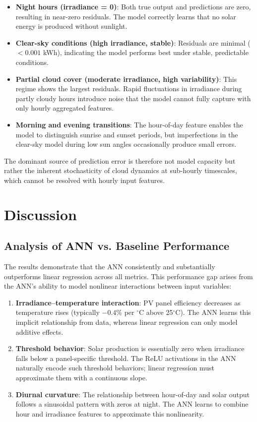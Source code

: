 \documentclass[11pt, a4paper]{article}
\begin{document}
\begin{itemize}
    \item \textbf{Night hours (irradiance = 0)}: Both true output and predictions
    are zero, resulting in near-zero residuals. The model correctly learns that
    no solar energy is produced without sunlight.
    \item \textbf{Clear-sky conditions (high irradiance, stable)}: Residuals are
    minimal ($< 0.001$ kWh), indicating the model performs best under stable,
predictable conditions.
    \item \textbf{Partial cloud cover (moderate irradiance, high variability)}:
    This regime shows the largest residuals. Rapid fluctuations in irradiance
    during partly cloudy hours introduce noise that the model cannot fully
capture with only hourly aggregated features.
    \item \textbf{Morning and evening transitions}: The hour-of-day feature
    enables the model to distinguish sunrise and sunset periods, but
    imperfections in the clear-sky model during low sun angles occasionally
    produce small errors.
\end{itemize}

The dominant source of prediction error is therefore not model capacity but
rather the inherent stochasticity of cloud dynamics at sub-hourly timescales,
which cannot be resolved with hourly input features.

\section{Discussion}\label{sec:discussion}

\subsection{Analysis of ANN vs. Baseline Performance}

The results demonstrate that the ANN consistently and substantially outperforms
linear regression across all metrics. This performance gap arises from the
ANN's ability to model nonlinear interactions between input variables:

\begin{enumerate}
    \item \textbf{Irradiance--temperature interaction}: PV panel efficiency
decreases as temperature rises (typically $-0.4\%$ per $^\circ$C above
25$^\circ$C). The ANN learns this implicit relationship from data, whereas
linear regression can only model additive effects.
    \item \textbf{Threshold behavior}: Solar production is essentially zero
when irradiance falls below a panel-specific threshold. The ReLU activations
in the ANN naturally encode such threshold behaviors; linear regression must
approximate them with a continuous slope.
    \item \textbf{Diurnal curvature}: The relationship between hour-of-day and
solar output follows a sinusoidal pattern with zeros at night. The ANN learns
to combine hour and irradiance features to approximate this nonlinearity.
\end{enumerate}
\end{document}
